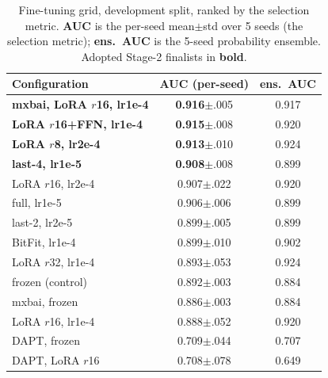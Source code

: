 \documentclass[conference]{IEEEtran}
\begin{document}
\begin{table}[t]
\caption{Fine-tuning grid, development split, ranked by the
selection metric. \textbf{AUC} is the per-seed mean$\pm$std over 5 seeds (the
selection metric); \textbf{ens.\ AUC} is the 5-seed probability ensemble. Adopted
Stage-2 finalists in \textbf{bold}.}
\label{tab:ft-grid}
\centering
\small
\setlength{\tabcolsep}{4pt}
\begin{tabular}{@{}lcc@{}}
\toprule
\textbf{Configuration} & \textbf{AUC (per-seed)} & \textbf{ens.\ AUC} \\
\midrule
\textbf{mxbai, LoRA $r$16, lr1e-4}  & \textbf{0.916}{\footnotesize$\pm$.005} & 0.917 \\
\textbf{LoRA $r$16+FFN, lr1e-4}     & \textbf{0.915}{\footnotesize$\pm$.008} & 0.920 \\
\textbf{LoRA $r$8, lr2e-4}          & \textbf{0.913}{\footnotesize$\pm$.010} & 0.924 \\
\textbf{last-4, lr1e-5}             & \textbf{0.908}{\footnotesize$\pm$.008} & 0.899 \\
LoRA $r$16, lr2e-4                  & 0.907{\footnotesize$\pm$.022} & 0.920 \\
full, lr1e-5                        & 0.906{\footnotesize$\pm$.006} & 0.899 \\
last-2, lr2e-5                      & 0.899{\footnotesize$\pm$.005} & 0.899 \\
BitFit, lr1e-4                      & 0.899{\footnotesize$\pm$.010} & 0.902 \\
LoRA $r$32, lr1e-4                  & 0.893{\footnotesize$\pm$.053} & 0.924 \\
frozen (control)                   & 0.892{\footnotesize$\pm$.003} & 0.884 \\
mxbai, frozen                      & 0.886{\footnotesize$\pm$.003} & 0.884 \\
LoRA $r$16, lr1e-4                  & 0.888{\footnotesize$\pm$.052} & 0.920 \\
\midrule
DAPT, frozen                       & 0.709{\footnotesize$\pm$.044} & 0.707 \\
DAPT, LoRA $r$16                    & 0.708{\footnotesize$\pm$.078} & 0.649 \\
\bottomrule
\end{tabular}
\end{table}
\end{document}
